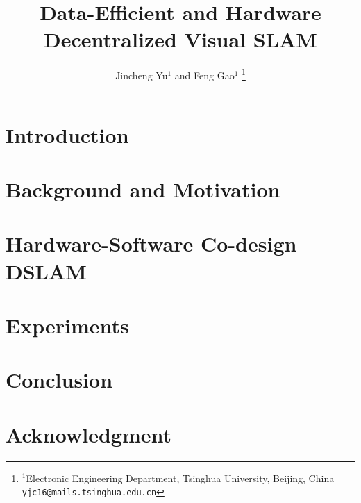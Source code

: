 \documentclass[letterpaper, 10 pt, conference]{ieeeconf}  %
\title{\LARGE \bf
Data-Efficient and Hardware  Decentralized Visual {SLAM}
}
\author{Jincheng Yu$^{1}$ and Feng Gao$^{1}$ %
\thanks{$^{1}$Electronic Engineering Department,
        Tsinghua University, Beijing, China
        {\tt\small yjc16@mails.tsinghua.edu.cn}}%
}
\begin{document}
\maketitle
\thispagestyle{empty}
\pagestyle{empty}


\begin{abstract}

\end{abstract}

\section{Introduction}


\section{Background and Motivation}



\section{Hardware-Software Co-design DSLAM}



\section{Experiments}


\section{Conclusion}



\section*{Acknowledgment}





\end{document}
